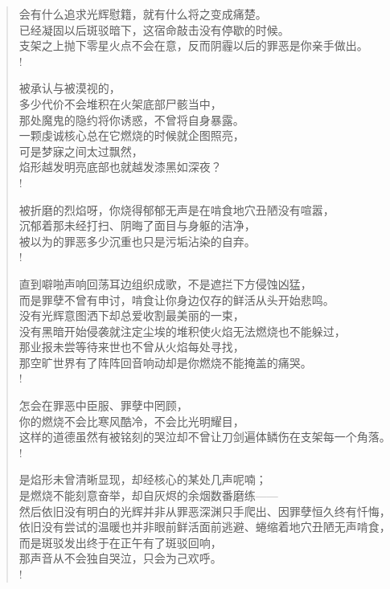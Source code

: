 \documentclass[UTF8, 12pt, a4paper]{ctexrep} %
\begin{document}
\begin{verse}

会有什么追求光辉慰籍，就有什么将之变成痛楚。\\
已经凝固以后斑驳暗下，这宿命敲击没有停歇的时候。\\
支架之上抛下零星火点不会在意，反而阴霾以后的罪恶是你亲手做出。\\!

被承认与被漠视的，\\
多少代价不会堆积在火架底部尸骸当中，\\
那处魔鬼的隐约将你诱惑，不曾将自身暴露。\\
一颗虔诚核心总在它燃烧的时候就企图照亮，\\
可是梦寐之间太过飘然，\\
焰形越发明亮底部也就越发漆黑如深夜？\\!

被折磨的烈焰呀，你烧得郁郁无声是在啃食地穴丑陋没有喧嚣，\\
沉郁着那未经打扫、阴晦了面目与身躯的洁净，\\
被以为的罪恶多少沉重也只是污垢沾染的自弃。\\!

直到噼啪声响回荡耳边组织成歌，不是遮拦下方侵蚀凶猛，\\
而是罪孽不曾有申讨，啃食让你身边仅存的鲜活从头开始悲鸣。\\
没有光辉意图洒下却总爱收割最美丽的一束，\\
没有黑暗开始侵袭就注定尘埃的堆积使火焰无法燃烧也不能躲过，\\
那业报未尝等待来世也不曾从火焰每处寻找，\\
那空旷世界有了阵阵回音响动却是你燃烧不能掩盖的痛哭。\\!

怎会在罪恶中臣服、罪孽中罔顾，\\
你的燃烧不会比寒风酷冷，不会比光明耀目，\\
这样的道德虽然有被铭刻的哭泣却不曾让刀剑遍体鳞伤在支架每一个角落。\\!

是焰形未曾清晰显现，却经核心的某处几声呢喃；\\
是燃烧不能刻意奋举，却自灰烬的余烟数番磨练——\\
然后依旧没有明白的光辉并非从罪恶深渊只手爬出、因罪孽恒久终有忏悔，\\
依旧没有尝试的温暖也并非眼前鲜活面前逃避、蜷缩着地穴丑陋无声啃食，\\
而是斑驳发出终于在正午有了斑驳回响，\\
那声音从不会独自哭泣，只会为己欢呼。\\!


\end{verse}
\end{document}
